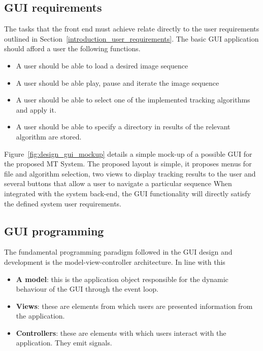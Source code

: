 \subsection{GUI requirements}
The tasks that the front end must achieve relate directly to the user
requirements outlined in Section~\ref{introduction_user_requirements}. The basic
GUI application should afford a user the following functions.  

\begin{itemize}
    \item A user should be able to load a desired image sequence
    \item A user should be able play, pause and iterate the image sequence 
    \item A user should be able to select one of the implemented tracking
        algorithms and apply it.
    \item A user should be able to specify a directory in results of the
        relevant algorithm are stored.
\end{itemize}

Figure~\ref{fig:design_gui_mockup} details a simple mock-up of a possible GUI
for the proposed MT System. The proposed layout is simple, it proposes menus for
file and algorithm selection, two views to display tracking results to the user
and several buttons that allow a user to navigate a particular sequence
When integrated with the system back-end, the GUI functionality will directly
satisfy the defined system user requirements.


\subsection{GUI programming}
The fundamental programming paradigm followed in the GUI design and development
is the model-view-controller architecture. In line with this
\begin{itemize}
    \item \textbf{A model}: this is the application object responsible for the
        dynamic behaviour of the GUI through the event loop.
    \item \textbf{Views}: these are elements from which users are presented
        information from the application. 
    \item \textbf{Controllers}: these are elements with which users interact with
        the application. They emit signals.
\end{itemize}

